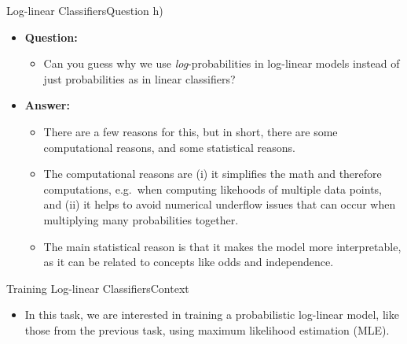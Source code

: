 \documentclass[t]{beamer}
\begin{document}
\begin{frame}{Log-linear Classifiers}{Question h)}
    \begin{itemize}
        \item \textbf{Question:}
              \begin{itemize}
                  \item Can you guess why we use \emph{log}-probabilities in
                        log-linear models instead of just probabilities as in
                        linear classifiers?
              \end{itemize}
              \pause
        \item \textbf{Answer:}
              \begin{itemize}
                  \item There are a few reasons for this, but in short, there
                        are some computational reasons, and some statistical
                        reasons.
                  \item The computational reasons are (i) it simplifies the math
                        and therefore computations, e.g.\ when computing
                        likehoods of multiple data points, and (ii) it helps to
                        avoid numerical underflow issues that can occur when
                        multiplying many probabilities together.
                  \item The main statistical reason is that it makes the model
                        more interpretable, as it can be related to concepts
                        like odds and independence.
              \end{itemize}
    \end{itemize}
\end{frame}

\begin{frame}{Training Log-linear Classifiers}{Context}
    \begin{itemize}
        \item In this task, we are interested in training a probabilistic
              log-linear model, like those from the previous task, using maximum
              likelihood estimation (MLE).
    \end{itemize}
\end{frame}
\end{document}
